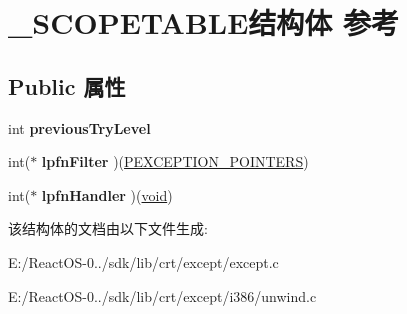 \hypertarget{struct___s_c_o_p_e_t_a_b_l_e}{}\section{\+\_\+\+S\+C\+O\+P\+E\+T\+A\+B\+L\+E结构体 参考}
\label{struct___s_c_o_p_e_t_a_b_l_e}
\subsection*{Public 属性}
\begin{DoxyCompactItemize}
\item 
\mbox{\label{struct___s_c_o_p_e_t_a_b_l_e_aeb68291f77e8b802c12b04c89ea3475e}} 
int {\bfseries previous\+Try\+Level}
\item 
\mbox{\label{struct___s_c_o_p_e_t_a_b_l_e_a15e8086ebac108f4a5a2034da3e92843}} 
int($\ast$ {\bfseries lpfn\+Filter} )(\hyperlink{struct___e_x_c_e_p_t_i_o_n___p_o_i_n_t_e_r_s}{P\+E\+X\+C\+E\+P\+T\+I\+O\+N\+\_\+\+P\+O\+I\+N\+T\+E\+RS})
\item 
\mbox{\label{struct___s_c_o_p_e_t_a_b_l_e_a89801c52188e441c609dbb50e1e410df}} 
int($\ast$ {\bfseries lpfn\+Handler} )(\hyperlink{interfacevoid}{void})
\end{DoxyCompactItemize}


该结构体的文档由以下文件生成\+:\begin{DoxyCompactItemize}
\item 
E\+:/\+React\+O\+S-\/0../sdk/lib/crt/except/except.\+c\item 
E\+:/\+React\+O\+S-\/0../sdk/lib/crt/except/i386/unwind.\+c\end{DoxyCompactItemize}
